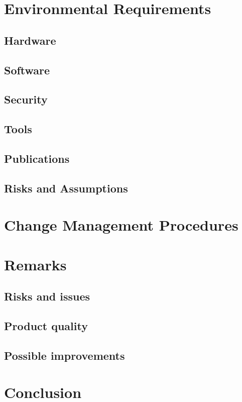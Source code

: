 \documentclass[a4paper,12pt,titlepage,margin=1in]{article}
\begin{document}
\section{Environmental Requirements}
	\subsection{Hardware}
	\subsection{Software}
	\subsection{Security}
	\subsection{Tools}
	\subsection{Publications}
	\subsection{Risks and Assumptions}

\section{Change Management Procedures}

\section{Remarks}
	\subsection{Risks and issues}
	\subsection{Product quality}
	\subsection{Possible improvements}

\section{Conclusion}
	
\end{document}
